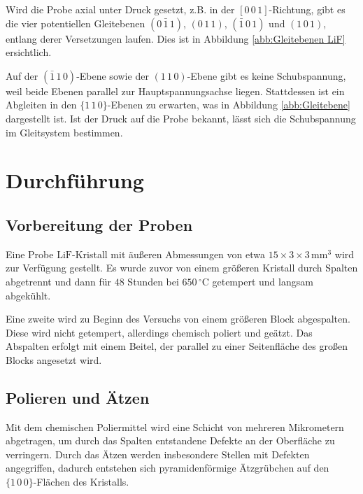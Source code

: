 \documentclass[12pt,a4paper]{scrartcl}
\numberwithin{equation}{section} %
\begin{document}
Wird die Probe axial unter Druck gesetzt, z.B. in der
$[0\,0\,1]$-Richtung, gibt es die vier potentiellen Gleitebenen
$(0\,\bar{1}\,1)$, $(0\,1\,1)$, $(\bar{1}\,0\,1)$ und
$(1\,0\,1)$, entlang derer Versetzungen laufen. Dies ist in Abbildung
\ref{abb:Gleitebenen LiF} ersichtlich.

Auf der $(\bar{1}\,1\,0)$-Ebene sowie der $(1\,1\,0)$-Ebene gibt es
keine Schubspannung, weil beide Ebenen parallel zur Hauptspannungsachse
liegen. Stattdessen ist ein Abgleiten in den $\lbrace1\,1\,0\rbrace$-Ebenen zu erwarten, was in Abbildung \ref{abb:Gleitebene} dargestellt ist. Ist der Druck auf die Probe bekannt, lässt sich die Schubspannung im Gleitsystem bestimmen.

\clearpage
\hypertarget{durchfuxfchrung}{%
\section{Durchführung}\label{durchfuxfchrung}}

\hypertarget{vorbereitung-der-proben}{%
\subsection{Vorbereitung der Proben}\label{vorbereitung-der-proben}}

Eine Probe $\mathrm{LiF}$-Kristall mit äußeren Abmessungen von etwa
$15 \times 3 \times 3 \,\mathrm{mm^3}$ wird zur Verfügung gestellt. Es
wurde zuvor von einem größeren Kristall durch Spalten abgetrennt und
dann für $48$ Stunden bei $650\,^\circ\mathrm C$ getempert und
langsam abgekühlt.

Eine zweite wird zu Beginn des Versuchs von einem größeren Block
abgespalten. Diese wird nicht getempert, allerdings chemisch poliert und
geätzt. Das Abspalten erfolgt mit einem Beitel, der parallel zu einer
Seitenfläche des großen Blocks angesetzt wird.

\hypertarget{polieren-und-uxe4tzen}{%
\subsection{Polieren und Ätzen}\label{polieren-und-uxe4tzen}}

Mit dem chemischen Poliermittel wird eine Schicht von mehreren
Mikrometern abgetragen, um durch das Spalten entstandene Defekte an der
Oberfläche zu verringern. Durch das Ätzen werden insbesondere Stellen
mit Defekten angegriffen, dadurch entstehen sich pyramidenförmige
Ätzgrübchen auf den $\{1\,0\,0\}$-Flächen des Kristalls.
\end{document}
